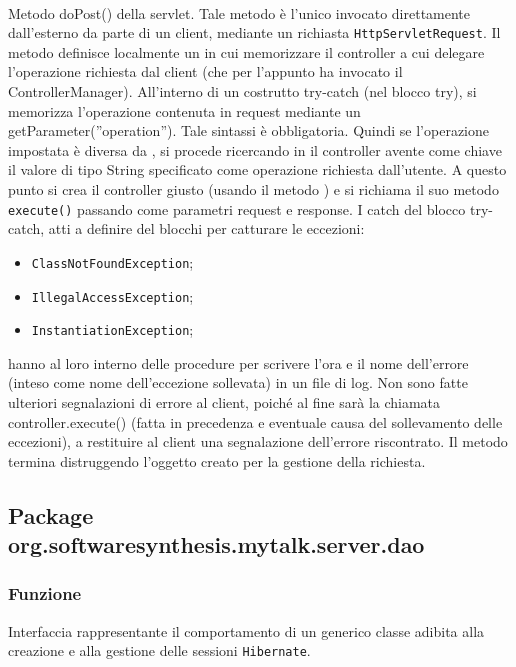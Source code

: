 \begin{description}
	\item{}\\
	Metodo doPost() della servlet. Tale metodo è l'unico invocato direttamente dall'esterno da parte di un client, mediante un richiasta \texttt{HttpServletRequest}. Il metodo definisce localmente un  in cui memorizzare il controller a cui delegare l'operazione richiesta dal client (che per l'appunto ha invocato il ControllerManager). All'interno di un costrutto try-catch (nel blocco try), si memorizza l'operazione contenuta in request mediante un getParameter(''operation''). Tale sintassi è obbligatoria. Quindi se l'operazione impostata è diversa da , si procede ricercando in  il controller avente come chiave il valore di tipo String specificato come operazione richiesta dall'utente. A questo punto si crea il controller giusto (usando il metodo ) e si richiama il suo metodo \texttt{execute()} passando come parametri request e response. I catch del blocco try-catch, atti a definire del blocchi per catturare le eccezioni: 
	\begin{itemize}
		\item \texttt{ClassNotFoundException};
		\item \texttt{IllegalAccessException};
		\item \texttt{InstantiationException};
	\end{itemize}
	
	hanno al loro interno delle procedure per scrivere l'ora e il nome dell'errore (inteso come nome dell'eccezione sollevata) in un file di log. Non sono fatte ulteriori segnalazioni di errore al client, poiché al fine sarà la chiamata controller.execute() (fatta in precedenza e eventuale causa del sollevamento delle eccezioni), a restituire al client una segnalazione dell'errore riscontrato. Il metodo termina distruggendo l'oggetto  creato per la gestione della richiesta.
	
\end{description}

\subsection{Package org.softwaresynthesis.mytalk.server.dao}\label{sec:dao}


\subsubsection*{Funzione}
Interfaccia rappresentante il comportamento di un generico classe adibita alla creazione e alla gestione delle sessioni \texttt{Hibernate}.

